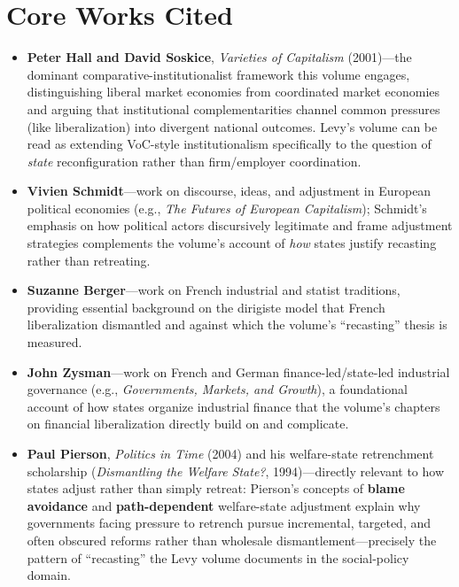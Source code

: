 \documentclass[12pt]{article}
\begin{document}
\section{Core Works Cited}

\begin{itemize}[leftmargin=*, itemsep=4pt]
    \item \textbf{Peter Hall and David Soskice}, \textit{Varieties of Capitalism} (2001)---the dominant comparative-institutionalist framework this volume engages, distinguishing liberal market economies from coordinated market economies and arguing that institutional complementarities channel common pressures (like liberalization) into divergent national outcomes. Levy's volume can be read as extending VoC-style institutionalism specifically to the question of \emph{state} reconfiguration rather than firm/employer coordination.
    \item \textbf{Vivien Schmidt}---work on discourse, ideas, and adjustment in European political economies (e.g., \textit{The Futures of European Capitalism}); Schmidt's emphasis on how political actors discursively legitimate and frame adjustment strategies complements the volume's account of \emph{how} states justify recasting rather than retreating.
    \item \textbf{Suzanne Berger}---work on French industrial and statist traditions, providing essential background on the dirigiste model that French liberalization dismantled and against which the volume's ``recasting'' thesis is measured.
    \item \textbf{John Zysman}---work on French and German finance-led/state-led industrial governance (e.g., \textit{Governments, Markets, and Growth}), a foundational account of how states organize industrial finance that the volume's chapters on financial liberalization directly build on and complicate.
    \item \textbf{Paul Pierson}, \textit{Politics in Time} (2004) and his welfare-state retrenchment scholarship (\textit{Dismantling the Welfare State?}, 1994)---directly relevant to how states adjust rather than simply retreat: Pierson's concepts of \textbf{blame avoidance} and \textbf{path-dependent} welfare-state adjustment explain why governments facing pressure to retrench pursue incremental, targeted, and often obscured reforms rather than wholesale dismantlement---precisely the pattern of ``recasting'' the Levy volume documents in the social-policy domain.
\end{itemize}
\end{document}
